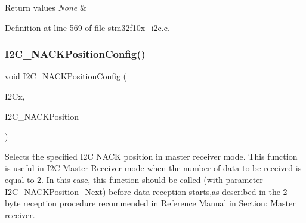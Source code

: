 \begin{DoxyRetVals}{Return values}
{\em None} & \\
\hline
\end{DoxyRetVals}


Definition at line 569 of file stm32f10x\+\_\+i2c.\+c.

\mbox{\label{group___i2_c___private___functions_gad08ebffc3a234d84e6405ec115bd74f1}} 
\subsubsection{\texorpdfstring{I2\+C\+\_\+\+N\+A\+C\+K\+Position\+Config()}{I2C\_NACKPositionConfig()}}
{\footnotesize\ttfamily void I2\+C\+\_\+\+N\+A\+C\+K\+Position\+Config (\begin{DoxyParamCaption}\item[{\hyperlink{struct_i2_c___type_def}{I2\+C\+\_\+\+Type\+Def} $\ast$}]{I2\+Cx,  }\item[{uint16\+\_\+t}]{I2\+C\+\_\+\+N\+A\+C\+K\+Position }\end{DoxyParamCaption})}



Selects the specified I2C N\+A\+CK position in master receiver mode. This function is useful in I2C Master Receiver mode when the number of data to be received is equal to 2. In this case, this function should be called (with parameter I2\+C\+\_\+\+N\+A\+C\+K\+Position\+\_\+\+Next) before data reception starts,as described in the 2-\/byte reception procedure recommended in Reference Manual in Section\+: Master receiver. 


